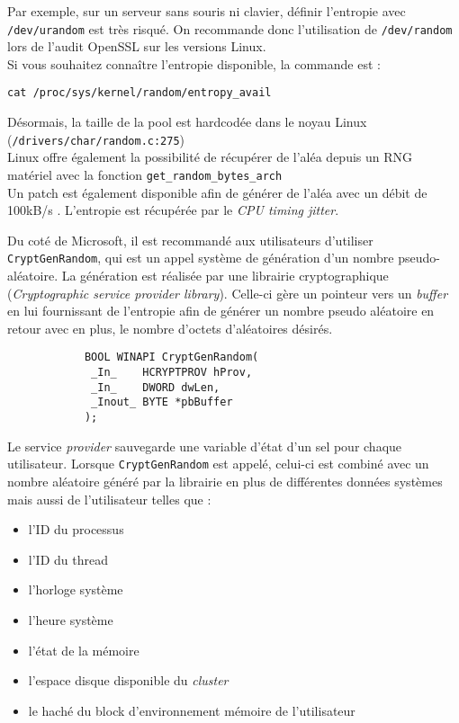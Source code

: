 			Par exemple, sur un serveur sans souris ni clavier, définir l'entropie avec	\texttt{/dev/urandom} est très risqué. On recommande donc l'utilisation de \texttt{/dev/random} lors de l'audit OpenSSL sur les versions Linux.\\
	
			Si vous souhaitez connaître l'entropie disponible, la commande est :
			\begin{center}
				\texttt{cat /proc/sys/kernel/random/entropy\_avail}
			\end{center}	
			
			Désormais, la taille de la pool est hardcodée dans le noyau Linux (\texttt{/drivers/char/random.c:275})\\
			
			Linux offre également la possibilité de récupérer de l’aléa depuis un RNG matériel avec la fonction \texttt{get\_random\_bytes\_arch} \cite{archlinuxRNG}\\
		
			Un patch est également disponible afin de générer de l'aléa avec un débit de 100kB/s \cite{mueller2013rng}. L'entropie est récupérée par le \textit{CPU timing jitter}.\\
			
		
			Du coté de Microsoft, il est recommandé aux utilisateurs d'utiliser \texttt{CryptGenRandom}, \cite{wikicryptgenrandom} qui est un appel système de génération d'un nombre pseudo-aléatoire. La génération est réalisée par une librairie cryptographique (\textit{Cryptographic service provider library}). Celle-ci gère un pointeur vers un \textit{buffer} en lui fournissant de l'entropie afin de générer un nombre pseudo aléatoire en retour avec en plus, le nombre	d'octets d'aléatoires désirés.
			
			\begin{verbatim}
			BOOL WINAPI CryptGenRandom(
			 _In_    HCRYPTPROV hProv,
			 _In_    DWORD dwLen,
			 _Inout_ BYTE *pbBuffer
			);
			\end{verbatim}
			
			Le service \textit{provider} sauvegarde une variable d'état d'un sel pour chaque utilisateur. Lorsque \texttt{CryptGenRandom} est appelé, celui-ci est combiné avec un nombre aléatoire généré par la librairie en plus de différentes données systèmes mais aussi de l'utilisateur telles que :\\
			\begin{itemize}
			\item l'ID du processus
			\item l'ID du thread
			\item l'horloge système
			\item l'heure système
			\item l'état de la mémoire
			\item l'espace disque disponible du \textit{cluster}
			\item le haché du block d'environnement mémoire de l'utilisateur\\
			\end{itemize} 
			
